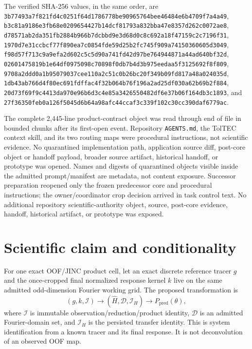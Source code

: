 \documentclass[11pt]{article}
\begin{document}
The verified SHA-256 values, in the same order, are
\texttt{3b77493a7f821fd4c0251f64d1786778be90965764bee46484e6b4709f7a4a49},
\texttt{b3c81a9186e3fb68e0209654427b14dcf81793a832bba47e8357d262c0072ae8},
\texttt{d78571ab2da351fb2884b966b7dcbbd9e3d68d0c8c692a18f47159c2c7196f31},
\texttt{1970d7e31ccbcf77f890ea7c0854fde59d25b2fc745f909a74150360605d3049},
\texttt{f98d57f713c9a9efa2d602c5c5d90a741fd42d97be764944871a44ad640bf32d},
\texttt{02601475819b1e64df0975098c70898f0db7b4d3b975eedaa5f3125692f8f809},
\texttt{9708a2ddd0a1b95079037cee110a2c51c0b26bc20f349b09fd817a48a024035d},
\texttt{1db43ab766d4f80ec691fdffac4f32b064b76f196a2ad25df030a62b69b2f884},
\texttt{20d73f69f9c4413da970e96b6d3c4e85a3426550482df6e37b06f164db3c1893},
and
\texttt{27f36350feb0a126f5045d6b64a98afc44ccaf3c339f102c30cc390daf6779ac}.

The complete 2,445-line product-contract object was read through end of file in
bounded chunks after its first-open event.  Repository \texttt{AGENTS.md}, the
TolTEC context skill, and its two routing maps were procedural instructions,
not scientific evidence.  No quarantined implementation path, application
source diff, post-core object or handoff payload, broader source artifact,
historical handoff, or prototype was opened.  Names and digests of quarantined
objects visible inside the admitted prompt/manifest are metadata, not content
exposure.  Successor preparation reopened only the frozen predecessor core and
procedural instructions; the owner/coordinator crop decision arrived in task
control text.  No additional repository scientific-authority object, source,
post-core evidence, handoff, historical artifact, or prototype was exposed.

\section{Scientific claim and conditionality}

For one exact OOF/JINC product cell, let an exact discrete reference tracer
$g$ and the once-cropped final normalized response kernel $k$ live on the same
admitted odd-dimension Fourier working grid.  The proposed transformation is
\[
 (g,k,\mathcal I) \longrightarrow (\widehat H,\mathcal D,\mathcal I_H)
 \longrightarrow P_{\mathrm{pred}}(\theta),
\]
where $\mathcal I$ is immutable observation/reduction/product identity,
$\mathcal D$ is an admitted Fourier-domain set, and $\mathcal I_H$ is the
persisted transfer identity.  This is system identification from a known
tracer and its final response.  It is not deconvolution of an observed OOF map.
\end{document}
